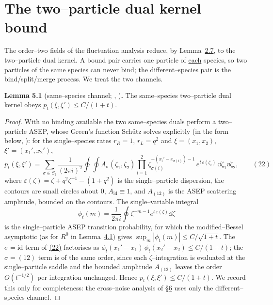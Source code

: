 \documentclass[11pt]{article}
\theoremstyle{plain}
\theoremstyle{definition}
\theoremstyle{remark}
\begin{document}
\section{The two--particle dual kernel bound}\label{sec_kernel}

The order--two fields of the fluctuation analysis reduce, by Lemma~\hyperref[lem_acr]{2.7}, to
the two--particle dual kernel. A bound pair carries one particle of \underline{each}
species, so two particles of the same species can never bind; the different--species
pair is the bind/split/merge process. We treat the two channels.

\label{lem_asep}\noindent\textbf{Lemma 5.1} (same--species channel; {\cite{Schutz}}, {\cite{TW08}})\textbf{.} 
The same--species two--particle dual kernel obeys $p_t(\xi,\xi')\le C/(1+t)$.
\par
\begin{proof}
With no binding available the two same--species duals perform a two--particle ASEP, whose
Green's function Sch\"utz solves explicitly \cite{Schutz} (in the form below, \cite{TW08}):
for the single--species rates $r_R=1$, $r_L=q^2$ and $\xi=(x_1,x_2)$, $\xi'=(x_1',x_2')$,
\label{eq_schutz2}
\begin{equation}
  p_t(\xi,\xi')=\sum_{\sigma\in S_2}\frac1{(2\pi i)^2}\oint\!\!\oint
  A_\sigma(\zeta_1,\zeta_2)\prod_{i=1}^2
  \zeta_{\sigma(i)}^{-(x_i'-x_{\sigma(i)})-1}\,e^{t\,\varepsilon(\zeta_i)}\,\dd\zeta_1\dd\zeta_2,\qquad(22)
\end{equation}
where $\varepsilon(\zeta)=\zeta+q^2\zeta^{-1}-(1+q^2)$ is the single--particle dispersion,
the contours are small circles about $0$, $A_{\mathrm{id}}\equiv1$, and $A_{(12)}$ is the
ASEP scattering amplitude, bounded on the contours. The single--variable integral
\[
  \phi_t(m)=\frac1{2\pi i}\oint \zeta^{-m-1}e^{t\,\varepsilon(\zeta)}\dd\zeta
\]
is the single--particle ASEP transition probability, for which the modified--Bessel
asymptotic (as for $R^0$ in Lemma~\hyperref[lem_free]{4.1}) gives $\sup_m|\phi_t(m)|\le C/\sqrt{1+t}$.
The $\sigma=\mathrm{id}$ term of \hyperref[eq_schutz2]{(22)} factorises as
$\phi_t(x_1'-x_1)\,\phi_t(x_2'-x_2)\le C/(1+t)$; the $\sigma=(12)$ term is of the same
order, since each $\zeta$--integration is evaluated at the single--particle saddle and the
bounded amplitude $A_{(12)}$ leaves the order $O(t^{-1/2})$ per integration unchanged.
Hence $p_t(\xi,\xi')\le C/(1+t)$. We record this only for completeness: the cross--noise
analysis of \S\hyperref[sec_ew]{6} uses only the different--species channel.
\end{proof}
\end{document}
